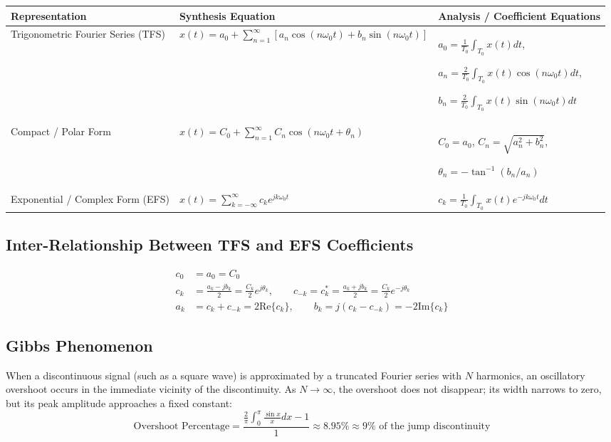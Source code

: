 \documentclass[12pt,a4paper]{article}
\renewcommand{\arraystretch}{1.45}
\begin{document}
\par\vspace{6pt}\noindent
\begingroup
\setlength{\tabcolsep}{5pt}
\setlength{\extrarowheight}{3pt}
\renewcommand{\arraystretch}{1.4}
\begin{tabularx}{\linewidth}{|B{4cm}|Y|Y|}
\hline
\textbf{Representation} & \textbf{Synthesis Equation} & \textbf{Analysis / Coefficient Equations} \\
\hline
Trigonometric Fourier Series (TFS) & $x(t) = a_0 + \sum_{n=1}^\infty [a_n \cos(n\omega_0 t) + b_n \sin(n\omega_0 t)]$ & $a_0 = \frac{1}{T_0} \int_{T_0} x(t) dt$, \par $a_n = \frac{2}{T_0} \int_{T_0} x(t) \cos(n\omega_0 t) dt$, \par $b_n = \frac{2}{T_0} \int_{T_0} x(t) \sin(n\omega_0 t) dt$ \\
\hline
Compact / Polar Form & $x(t) = C_0 + \sum_{n=1}^\infty C_n \cos(n\omega_0 t + \theta_n)$ & $C_0 = a_0$, \quad $C_n = \sqrt{a_n^2 + b_n^2}$, \par $\theta_n = -\tan^{-1}(b_n / a_n)$ \\
\hline
Exponential / Complex Form (EFS) & $x(t) = \sum_{k=-\infty}^\infty c_k e^{j k \omega_0 t}$ & $c_k = \frac{1}{T_0} \int_{T_0} x(t) e^{-j k \omega_0 t} dt$ \\
\hline
\end{tabularx}
\endgroup

\subsection{Inter-Relationship Between TFS and EFS Coefficients}
\begin{align}
  c_0 &= a_0 = C_0 \\
  c_k &= \frac{a_k - j b_k}{2} = \frac{C_k}{2} e^{j\theta_k}, \qquad c_{-k} = c_k^* = \frac{a_k + j b_k}{2} = \frac{C_k}{2} e^{-j\theta_k} \\
  a_k &= c_k + c_{-k} = 2 \text{Re}\{c_k\}, \qquad b_k = j(c_k - c_{-k}) = -2 \text{Im}\{c_k\}
\end{align}

\subsection{Gibbs Phenomenon}
When a discontinuous signal (such as a square wave) is approximated by a truncated Fourier series with $N$ harmonics, an oscillatory overshoot occurs in the immediate vicinity of the discontinuity. As $N \to \infty$, the overshoot does not disappear; its width narrows to zero, but its peak amplitude approaches a fixed constant:
\begin{equation}
  \text{Overshoot Percentage} = \frac{\frac{2}{\pi} \int_0^\pi \frac{\sin x}{x} dx - 1}{1} \approx 8.95\% \approx 9\% \text{ of the jump discontinuity}
\end{equation}
\end{document}
